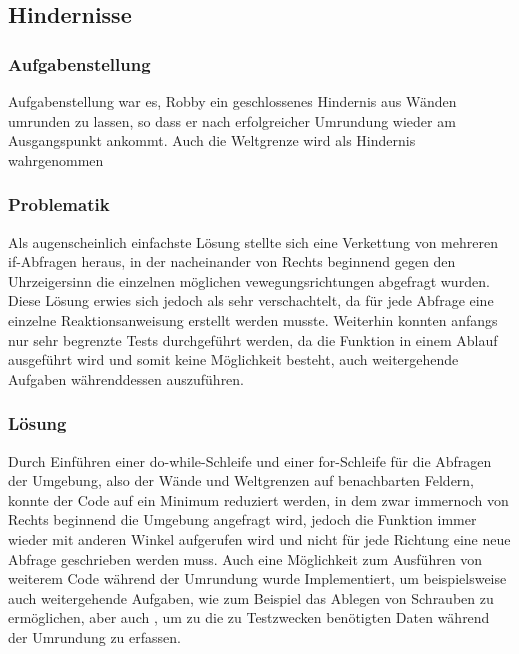 \subsection{Hindernisse}

\subsubsection*{Aufgabenstellung}
Aufgabenstellung war es, Robby ein geschlossenes Hindernis aus Wänden umrunden zu lassen, so dass er nach erfolgreicher Umrundung wieder am Ausgangspunkt ankommt.
Auch die Weltgrenze wird als Hindernis wahrgenommen

\subsubsection*{Problematik}
Als augenscheinlich einfachste Lösung stellte sich eine Verkettung von mehreren if-Abfragen heraus, in der nacheinander von Rechts beginnend gegen den Uhrzeigersinn die einzelnen möglichen vewegungsrichtungen abgefragt wurden. Diese Lösung erwies sich jedoch als sehr verschachtelt, da für jede Abfrage eine einzelne Reaktionsanweisung erstellt werden musste.
Weiterhin konnten anfangs nur sehr begrenzte Tests durchgeführt werden, da die Funktion in einem Ablauf ausgeführt wird und somit keine Möglichkeit besteht, auch weitergehende Aufgaben währenddessen auszuführen.


\subsubsection*{Lösung}
Durch Einführen einer do-while-Schleife und einer for-Schleife für die Abfragen der Umgebung, also der Wände und Weltgrenzen auf benachbarten Feldern, konnte der Code auf ein Minimum reduziert werden, in dem  zwar immernoch von Rechts beginnend die Umgebung angefragt wird, jedoch die Funktion immer wieder mit anderen Winkel aufgerufen wird und nicht für jede Richtung eine neue Abfrage geschrieben werden muss.
Auch eine Möglichkeit zum Ausführen von weiterem Code während der Umrundung wurde Implementiert, um beispielsweise auch weitergehende Aufgaben, wie zum Beispiel das Ablegen von Schrauben zu ermöglichen, aber auch , um zu die zu Testzwecken benötigten Daten während der Umrundung zu erfassen.

